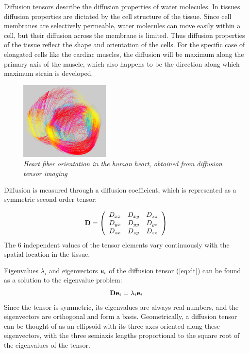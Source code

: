 Diffusion tensors describe the diffusion properties of water molecules. In tissues diffusion properties are dictated by the cell structure of the tissue. Since cell membranes are selectively permeable, water molecules can move easily within a cell, but their diffusion across the membrane is limited. Thus diffusion properties of the tissue reflect the shape and orientation of the cells. For the specific case of elongated cells like the cardiac muscles, the diffusion will be maximum along the primary axis of the muscle, which also happens to be the direction along which maximum strain is developed.

\begin{figure}
\begin{center}
\includegraphics[width=0.4\textwidth]{images/fibers3}
\caption{\em \small Heart fiber orientation in the human heart, obtained from diffusion tensor imaging}
\label{fibers-dti}
\end{center}  
\end{figure} 

Diffusion is measured through a diffusion coefficient, which is represented as a symmetric second order tensor:

\begin{equation}
\label{eq:dt}
{\bf D} = \left( 				
\begin{array}{ccc}
D_{xx} & D_{xy} & D_{xz} \\
D_{yx} & D_{yy} & D_{yz} \\	
D_{zx} & D_{zy} & D_{zz}
\end{array}
          \right)
\end{equation}
The 6 independent values of the tensor elements vary continuously with the spatial location in the tissue.

Eigenvalues $\lambda_i$ and eigenvectors ${\bf e}_i$ of the diffusion tensor (\ref{eq:dt}) can be found
as a solution to the eigenvalue problem:
\[
{\bf De}_i = \lambda_i{\bf e}_i
\]
Since the tensor is symmetric, its eigenvalues are always real numbers, and the eigenvectors are orthogonal and form a basis. Geometrically, a diffusion tensor can be thought of as an ellipsoid with its three axes oriented along these eigenvectors, with the three semiaxis lengths proportional to the square root of the eigenvalues of the tensor.

